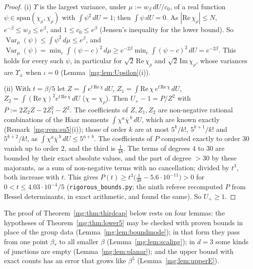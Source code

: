 \documentclass[11pt,a4paper]{article}
\theoremstyle{definition}
\theoremstyle{remark}
\DeclareMathOperator{\Var}{Var}
\newcommand{\dU}{\,dU}
\begin{document}
\begin{proof}
(i) $\Upsilon$ is the largest variance, under $\mu:=w_\beta\,dU/c_0$, of a real function $\psi\in\mathrm{span}(\chi_\rho,\overline{\chi_\rho})$ with $\int\psi^2\dU=1$; then $\int\psi\dU=0$. As
$|\mathrm{Re}\,\chi_\rho|\le N$, $e^{-\beta}\le w_\beta\le e^\beta$, and $1\le c_0\le e^\beta$ (Jensen's inequality for the lower bound). So $\Var_\mu(\psi)\le\int\psi^2\,d\mu\le e^\beta$, and
$\Var_\mu(\psi)=\min_c\int(\psi-c)^2\,d\mu\ge e^{-2\beta}\min_c\int(\psi-c)^2\dU=e^{-2\beta}$. This holds for every such $\psi$, in particular for $\sqrt2\,\mathrm{Re}\,\chi_\rho$ and
$\sqrt2\,\mathrm{Im}\,\chi_\rho$, whose variances are $\Upsilon_\pm$ when $\iota=0$ (Lemma~\ref{mg:lem:Upsilon}(i)).

(ii) With $t=\beta/5$ let $Z=\int e^{t\,\mathrm{Re}\,\chi}\dU$, $Z_1=\int\mathrm{Re}\,\chi\,e^{t\,\mathrm{Re}\,\chi}\dU$, $Z_2=\int(\mathrm{Re}\,\chi)^2e^{t\,\mathrm{Re}\,\chi}\dU$ ($\chi=\chi_\rho$). Then
$U_+-1=P/Z^2$ with $P:=2Z_2Z-2Z_1^2-Z^2$. The coefficients of $Z,Z_1,Z_2$ are non-negative rational combinations of the Haar moments $\int\chi^a\overline\chi^{\,b}\dU$, which
are known exactly (Remark~\ref{mg:rem:su5}(i)); those of order $k$ are at most $5^k/k!$, $5^{k+1}/k!$ and $5^{k+2}/k!$, as $\int\chi^a\overline\chi^{\,b}\dU\le5^{a+b}$. The coefficients of
$P$ computed exactly to order $30$ vanish up to order $2$, and the third is $\frac1{48}$. The terms of degrees $4$ to $30$ are bounded by their exact absolute values, and the part of degree
$>30$ by these majorants, as a sum of non-negative terms with no cancellation; divided by $t^3$, both increase with $t$. This gives $P(t)\ge t^3\bigl(\frac1{48}-5.6\cdot10^{-11}\bigr)>0$ for
$0<t\le4.03\cdot10^{-4}/5$ (\texttt{rigorous\_bounds.py}; the ninth referee recomputed $P$ from Bessel determinants, in exact arithmetic, and found the same). So $U_+\ge1$.
\end{proof}

The proof of Theorem~\ref{mg:thm:thirdcap} below rests on four lemmas: the hypotheses of Theorem~\ref{mg:thm:lower5} may be checked with proven bounds in place of the group data
(Lemma~\ref{mg:lem:boundmode}); in that form they pass from one point $\beta_*$ to all smaller $\beta$ (Lemma~\ref{mg:lem:scaling}); in $d=3$ some kinds of junctions are empty
(Lemma~\ref{mg:lem:planar}); and the upper bound with exact counts has an error that grows like $\beta^5$ (Lemma~\ref{mg:lem:upperE}).
\end{document}

